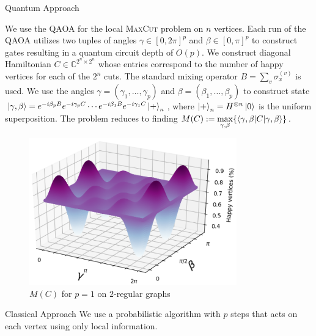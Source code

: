 \documentclass[final]{beamer}
\newlength{\twocolwid}
\begin{document}
\begin{frame}[t]
\begin{columns}[t]
\begin{column}{\twocolwid}
\begin{block}{Quantum Approach}    
    
    We use the QAOA for the local \textsc{MaxCut} problem on $n$ vertices. Each run of the QAOA utilizes two tuples of angles $\gamma \in [0,2\pi]^p$ and $\beta \in [0, \pi]^p$ to construct gates resulting in a quantum circuit depth of $O(p)$. We construct diagonal Hamiltonian $C \in \mathbb{C}^{2^n \times 2^n}$ whose entries correspond to the number of happy vertices for each of the $2^n$ cuts. The standard mixing operator $B = \sum_{v} \sigma_x^{(v)}$ is used. We use the angles $\gamma = (\gamma_1, \dots, \gamma_p)$ and $\beta = (\beta_1, \dots, \beta_p)$ to construct state $\ket{\gamma,\beta} = e^{-i \beta_p B} e^{-i \gamma_p C} \cdots e^{-i \beta_1 B} e^{-i \gamma_1 C} \ket{+}_n$, where $\ket{+}_n = H^{\otimes n}\ket{0}$ is the uniform superposition. The problem reduces to finding $M(C):= \max\limits_{\gamma, \beta } \{ \braket{\gamma, \beta|C|\gamma,\beta} \}$.

    \begin{figure}[h]
          \includegraphics[width=0.8\textwidth]{statespace-1p-untitled.png}
          \caption{$M(C)$ for $p=1$ on $2$-regular graphs} 
          \label{fig:plot}
    \end{figure}
    
\end{block}

\vspace{-.8in}

\begin{block}{Classical Approach}
    We use a probabilistic algorithm with $p$ steps that acts on each vertex using only local information.

    \vspace{.3in}
    

\end{block}
\end{column}
\end{columns}
\end{frame}
\end{document}
